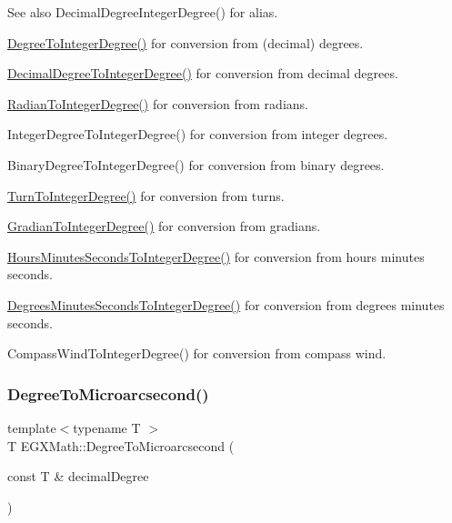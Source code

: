 \begin{DoxySeeAlso}{See also}
Decimal\+Degree\+Integer\+Degree() for alias. 

\mbox{\hyperlink{group___e_g_x_math-_conversions-_angle_conversions-_degree_gaabd20f21be3c18ee423d0bc1a677c6f6}{Degree\+To\+Integer\+Degree()}} for conversion from (decimal) degrees. 

\mbox{\hyperlink{group___e_g_x_math-_conversions-_angle_conversions-_decimal_degree_ga115239ea7202dbc6a6c9fba68e0ac189}{Decimal\+Degree\+To\+Integer\+Degree()}} for conversion from decimal degrees. 

\mbox{\hyperlink{group___e_g_x_math-_conversions-_angle_conversions-_radian_gac84796dfdeb56235e1e338522a5f9350}{Radian\+To\+Integer\+Degree()}} for conversion from radians. 

Integer\+Degree\+To\+Integer\+Degree() for conversion from integer degrees. 

Binary\+Degree\+To\+Integer\+Degree() for conversion from binary degrees. 

\mbox{\hyperlink{group___e_g_x_math-_conversions-_angle_conversions-_turn_ga999085c62490997da870618e20e88ebb}{Turn\+To\+Integer\+Degree()}} for conversion from turns. 

\mbox{\hyperlink{group___e_g_x_math-_conversions-_angle_conversions-_gradian_ga555aae885f8a7d0876a36aa07cbbd816}{Gradian\+To\+Integer\+Degree()}} for conversion from gradians. 

\mbox{\hyperlink{group___e_g_x_math-_conversions-_angle_conversions-_hours_minutes_seconds_gadf3829ca1704cfd64886a4de1b3e366f}{Hours\+Minutes\+Seconds\+To\+Integer\+Degree()}} for conversion from hours minutes seconds. 

\mbox{\hyperlink{group___e_g_x_math-_conversions-_angle_conversions-_degrees_minutes_seconds_ga973287a878e521e3c1d4d1f973ecdcfe}{Degrees\+Minutes\+Seconds\+To\+Integer\+Degree()}} for conversion from degrees minutes seconds. 

Compass\+Wind\+To\+Integer\+Degree() for conversion from compass wind. 
\end{DoxySeeAlso}
\mbox{\label{group___e_g_x_math-_conversions-_angle_conversions-_degree_ga31b65388fe1b4656663b3d66b9d764e6}} 
\subsubsection{\texorpdfstring{Degree\+To\+Microarcsecond()}{DegreeToMicroarcsecond()}}
{\footnotesize\ttfamily template$<$typename T $>$ \\
T E\+G\+X\+Math\+::\+Degree\+To\+Microarcsecond (\begin{DoxyParamCaption}\item[{const T \&}]{decimal\+Degree }\end{DoxyParamCaption})}



